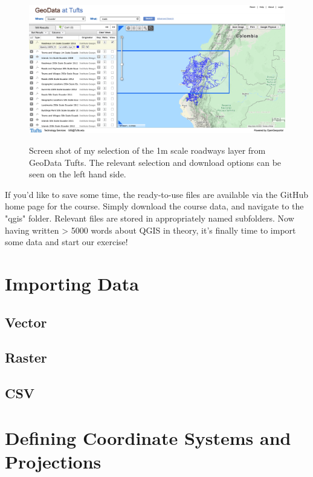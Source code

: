 \documentclass{article}
\begin{document}
\begin{figure}[htbp]
    \centering
    \includegraphics[width=\textwidth]{Fig_8_Tufts.png}
    \label{fig8}
    \caption{Screen shot of my selection of the 1m scale roadways layer from GeoData Tufts. The relevant selection and download options can be seen on the left hand side.}
\end{figure}

If you'd like to save some time, the ready-to-use files are available via the GitHub home page for the course. Simply download the course data, and navigate to the "qgis" folder. Relevant files are stored in appropriately named subfolders. Now having written > 5000 words about QGIS in theory, it's finally time to import some data and start our exercise! 

\section{Importing Data}

\subsection{Vector}

\subsection{Raster}

\subsection{CSV}

\section{Defining Coordinate Systems and Projections}
\end{document}
